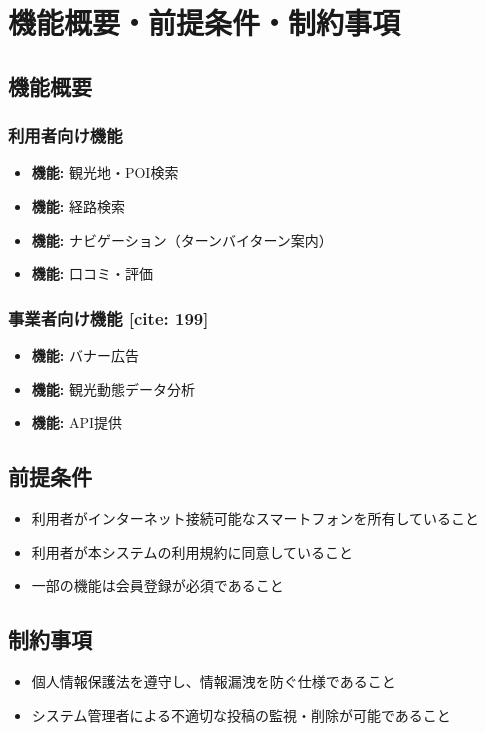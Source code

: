 \documentclass[a4j, 11pt, report]{jsarticle}
\begin{document}
\section{機能概要・前提条件・制約事項}

\subsection{機能概要}
\subsubsection{利用者向け機能}
\begin{itemize}
    \item \textbf{機能:} 観光地・POI検索
    \item \textbf{機能:} 経路検索
    \item \textbf{機能:} ナビゲーション（ターンバイターン案内）
    \item \textbf{機能:} 口コミ・評価
\end{itemize}

\subsubsection{事業者向け機能 [cite: 199]}
\begin{itemize}
    \item \textbf{機能:} バナー広告
    \item \textbf{機能:} 観光動態データ分析
    \item \textbf{機能:} API提供
\end{itemize}

\subsection{前提条件}
\begin{itemize}
    \item 利用者がインターネット接続可能なスマートフォンを所有していること 
    \item 利用者が本システムの利用規約に同意していること
    \item 一部の機能は会員登録が必須であること
\end{itemize}

\subsection{制約事項}
\begin{itemize}
    \item 個人情報保護法を遵守し、情報漏洩を防ぐ仕様であること
    \item システム管理者による不適切な投稿の監視・削除が可能であること
\end{itemize}
\end{document}
